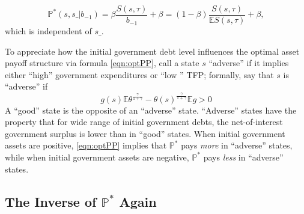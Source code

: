 \documentclass[12pt]{article}
\newcommand{\EE}{\mathbb E}
\begin{document}
\begin{equation}\label{eqn:optPP}
 \mathbb{P}^*(s, s\_ |b_{-1}) = \beta\frac{S(s,\tau)}{b_{-1}} + \beta=(1-\beta)\frac{S(s,\tau)}{\EE S(s,\tau)} + \beta,
 \end{equation} which is independent of $s\_$.

To appreciate how  the initial government debt level influences the optimal asset payoff structure via formula \eqref{eqn:optPP}, call a
 state $s$ ``adverse''  if it implies either ``high'' government expenditures or ``low '' TFP; formally, say that  $s$ is ``adverse'' if
\[   g(s)\EE \theta^\frac{\gamma}{1+\gamma}-\theta(s)^\frac\gamma{1+\gamma}\EE g >0\]
A ``good'' state is the opposite of an ``adverse'' state.  ``Adverse'' states have the property that for  wide range of initial government debts, the net-of-interest government surplus is lower than in ``good'' states.  When initial government assets are positive, \eqref{eqn:optPP} implies that  $\mathbb{P}^*$   pays {\em more} in ``adverse'' states, while when initial government assets are negative, $\mathbb{P}^*$  pays {\em less} in ``adverse'' states.

%
%		
%	
%			

\subsection{The Inverse of $\mathbb P^*$ Again}\label{sec:David42} %
\end{document}
